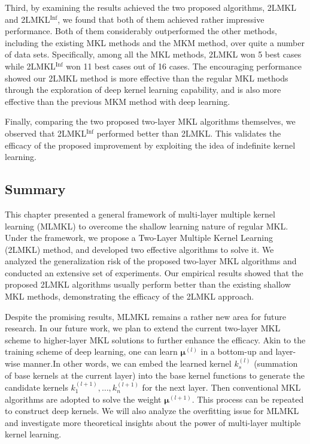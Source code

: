 Third, by examining the results achieved the two proposed algorithms, 2LMKL and 2LMKL$^{\mathrm{Inf}}$, we found that both of them achieved rather impressive performance. Both of them considerably outperformed the other methods, including the existing MKL methods and the MKM method, over quite a number of data sets. Specifically, among all the MKL methods, 2LMKL won 5 best cases while 2LMKL$^{\mathrm{Inf}}$ won 11 best cases out of 16 cases. The encouraging performance showed our 2LMKL method is more effective than the regular MKL methods through the exploration of deep kernel learning capability, and is also more effective than the previous MKM method with deep learning.

Finally, comparing the two proposed two-layer MKL algorithms themselves, we observed that 2LMKL$^{\mathrm{Inf}}$ performed better than 2LMKL. This validates the efficacy of the proposed improvement by exploiting the idea of indefinite kernel learning.

\subsection{Summary}

This chapter presented a general framework of multi-layer multiple kernel
learning (MLMKL) to overcome the shallow learning nature of regular MKL. Under the framework, we propose a Two-Layer Multiple Kernel Learning (2LMKL) method, and developed two effective algorithms to solve it. We analyzed the generalization risk of the proposed two-layer MKL algorithms and conducted an extensive set of experiments. Our empirical results showed that the proposed 2LMKL algorithms usually perform better than the existing shallow MKL methods, demonstrating the efficacy of the 2LMKL approach.

Despite the promising results, MLMKL remains a rather new area for future research. In our future work, we plan to extend the current two-layer MKL scheme to higher-layer MKL solutions to further enhance the efficacy. Akin to the training scheme of deep learning\cite{neco/HintonOT06}, one can learn $\bm\mu^{(l)}$ in a bottom-up and layer-wise manner.In other words, we can embed the learned kernel $k^{(l)}_s$ (summation of base kernels at the current layer) into the base kernel functions to generate the candidate kernels $k^{(l+1)}_1, \ldots, k^{(l+1)}_n$ for the next layer. Then conventional MKL algorithms are adopted to solve the weight $\bm\mu^{(l+1)}$. This process can be repeated to construct deep kernels.  We will also analyze the overfitting issue for MLMKL and investigate more theoretical insights about the power of multi-layer multiple kernel learning.

